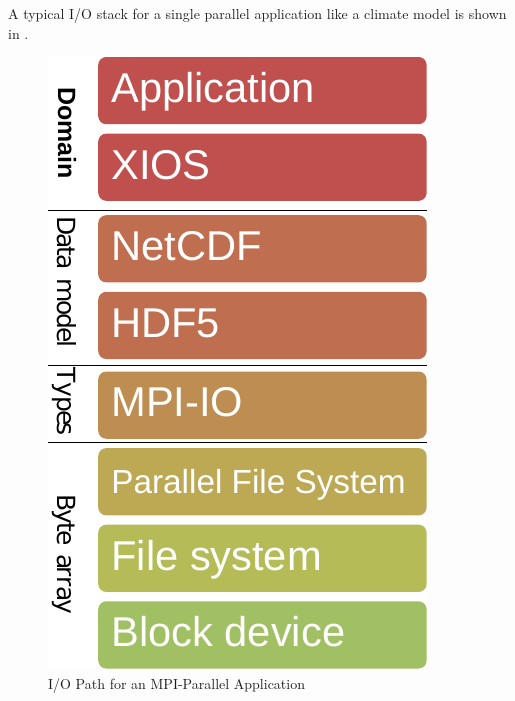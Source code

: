\documentclass[a4paper]{article}
\begin{document}
A typical I/O stack for a single parallel application like a climate model is shown in .

\begin{minipage}{0.2\textwidth}
\begin{figure}[H]
  \includegraphics[width=\textwidth]{layers-xios}
  \caption{I/O Path for an MPI-Parallel Application}
  \label{fig:layers}
\end{figure}
\end{minipage}
\qquad
\end{document}
